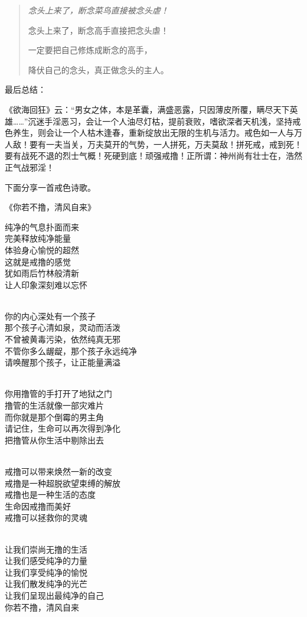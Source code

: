\begin{quotation}\it
    念头上来了，断念菜鸟直接被念头虐！

    念头上来了，断念高手直接把念头虐！

    一定要把自己修炼成断念的高手，

    降伏自己的念头，真正做念头的主人。
\end{quotation}

最后总结：

《欲海回狂》云：“男女之体，本是革囊，满盛恶露，只因薄皮所覆，瞒尽天下英雄……”沉迷手淫恶习，会让一个人油尽灯枯，提前衰败，嗜欲深者天机浅，坚持戒色养生，则会让一个人枯木逢春，重新绽放出无限的生机与活力。戒色如一人与万人敌！要有一夫当关，万夫莫开的气势，一人拼死，万夫莫敌！拼死戒，戒到死！要有战死不退的烈士气概！死硬到底！顽强戒撸！正所谓：神州尚有壮士在，浩然正气战邪淫！

下面分享一首戒色诗歌。

\begin{center}
    《你若不撸，清风自来》\it
    \begin{multicols}{2}
        纯净的气息扑面而来 \\ 完美释放纯净能量 \\ 体验身心愉悦的超然 \\ 这就是戒撸的感觉 \\ 犹如雨后竹林般清新 \\ 让人印象深刻难以忘怀

        ~\\

        你的内心深处有一个孩子 \\ 那个孩子心清如泉，灵动而活泼 \\ 不曾被黄毒污染，依然纯真无邪 \\ 不管你多么龌龊，那个孩子永远纯净 \\ 请唤醒那个孩子，让正能量满溢

        ~\\

        你用撸管的手打开了地狱之门 \\ 撸管的生活就像一部灾难片 \\ 而你就是那个倒霉的男主角 \\ 请记住，生命可以再次得到净化 \\ 把撸管从你生活中剔除出去

        ~\\

        戒撸可以带来焕然一新的改变 \\ 戒撸是一种超脱欲望束缚的解放 \\ 戒撸也是一种生活的态度 \\ 生命因戒撸而美好 \\ 戒撸可以拯救你的灵魂

        ~\\

        让我们崇尚无撸的生活 \\ 让我们感受纯净的力量 \\ 让我们享受纯净的愉悦 \\ 让我们散发纯净的光芒 \\ 让我们呈现出最纯净的自己 \\ 你若不撸，清风自来
    \end{multicols}
\end{center}
